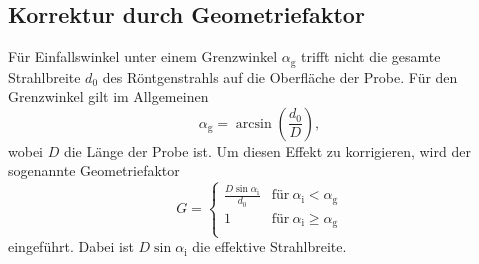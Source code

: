\subsection{Korrektur durch Geometriefaktor}
Für Einfallswinkel unter einem Grenzwinkel $\alpha_\mathrm{g}$ trifft nicht die gesamte Strahlbreite $d_0$ des Röntgenstrahls auf die Oberfläche der Probe. Für den Grenzwinkel gilt im Allgemeinen
\begin{equation*}
  \alpha_\mathrm{g} = \arcsin \left( \frac{d_0}{D} \right),
\end{equation*}
wobei $D$ die Länge der Probe ist. Um diesen Effekt zu korrigieren, wird der sogenannte Geometriefaktor
\begin{equation}
  G = \left\{
  \begin{array}{ll}
    \frac{D \sin \alpha_\mathrm{i}}{d_0} & \mathrm{für }\  \alpha_\mathrm{i} < \alpha_\mathrm{g}\\
    1 & \mathrm{für }\  \alpha_\mathrm{i} \geq \alpha_\mathrm{g} \\
\end{array}
\right.
  \label{eqn:geofaktor}
\end{equation}
eingeführt. Dabei ist $D \sin \alpha_\mathrm{i}$ die effektive Strahlbreite.
